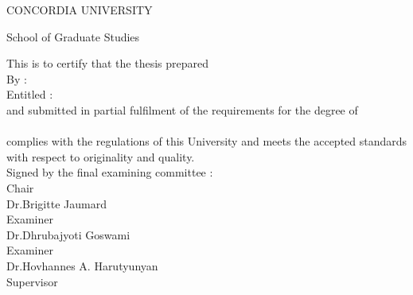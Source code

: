 \documentclass[11pt, a4paper, oneside]{Thesis} %
\begin{document}

\clearpage

\pagestyle{empty} %
  \vspace{1em}
     \begin{center}
        CONCORDIA UNIVERSITY
     \end{center}
     \begin{center}
        School of Graduate Studies
     \end{center}
     \vspace{3ex}
     This is to certify that the thesis prepared\\[2ex]
     By :\hspace{38pt}{\bf {\authornames}}\\[2ex]
     Entitled :\hspace*{13pt}{\bf \ttitle}\\[2ex] 
    and submitted in partial fulfilment of the requirements for the degree
    of\\[2ex]
    \hspace*{62pt}{\bf \degreename}\\[2ex]
    complies with the regulations of this University and meets the accepted
    standards with respect to originality and quality. \\[2ex]
    Signed by the final examining committee : \\[5ex]
    \hspace*{77pt}\underline{\hspace{234pt}} Chair\\
    \hspace*{77pt}Dr.\@ Brigitte Jaumard \\[2.5ex]
    \hspace*{77pt}\underline{\hspace{234pt}} Examiner\\
    \hspace*{77pt}Dr.\@ Dhrubajyoti Goswami \\[2.5ex]
    \hspace*{77pt}\underline{\hspace{234pt}} Examiner\\
    \hspace*{77pt}Dr.\@ Hovhannes A. Harutyunyan \\[2.5ex]
    \hspace*{77pt}\underline{\hspace{234pt}} Supervisor \\
\end{document}
